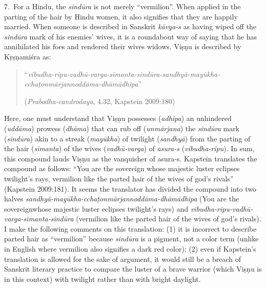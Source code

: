 7.~For a Hindu, the \textsl{sindūra} is not merely “vermilion”. When applied in the parting of the hair by Hindu women, it also signifies that they are happily married. When someone is described in Sanskrit \textsl{kāvya-s} as having wiped off the \textsl{sindūra} mark of his enemies’ wives, it is a roundabout way of saying that he has annihilated his foes and rendered their wives widows. Viṣṇu is described by Kṛṣṇamiśra as: 
\begin{quote}
“\textsl{vibudha-ripu-vadhū-varga-sīmanta-sindūra-sandhyā-mayūkha-cchaṭonmārjannoddāma-dhāmādhipa}” 

\hfill(\textsl{Prabodha-candrodaya}, 4.32, Kapstein 2009:180)
\end{quote}

Here, one must understand that Viṣṇu possesses (\textsl{adhipa}) an unhindered (\textsl{uddāma}) prowess (\textsl{dhāma}) that can rub off (\textsl{unmārjana}) the \textsl{sindūra} mark (\textsl{sindūra}) akin to a streak (\textsl{mayūkha}) of twilight (\textsl{sandhyā}) from the parting of the hair (\textsl{sīmanta}) of the wives (\textsl{vadhū-varga}) of \textsl{asura-s} (\textsl{vibudha-ripu}). In sum, this compound lauds Viṣṇu as the vanquisher of asura-s. Kapstein translates the compound as follows: “You are the sovereign whose majestic luster eclipses twilight’s rays, vermilion like the parted hair of the wives of god’s rivals” (Kapstein 2009:181). It seems the translator has divided the compound into two halves \textsl{sandhyā-mayūkha-cchaṭonmārjannoddāma-dhāmādhipa} (You are the sovereign\break whose majestic luster eclipses twilight’s rays) and \textsl{vibudha-ripu-vadhū-varga-sīmanta-sindūra} (vermilion like the parted hair of the wives of god’s rivals). I make the following comments on this translation: (1) it is incorrect to describe parted hair as “vermilion” because \textsl{sindūra} is a pigment, not a color term (unlike in English where vermilion also signifies a dark red color); (2) even if Kapstein’s translation is allowed for the sake of argument, it would still be a breach of Sanskrit literary practice to compare the luster of a brave warrior (which Viṣṇu is in this context) with twilight rather than with bright daylight. 

